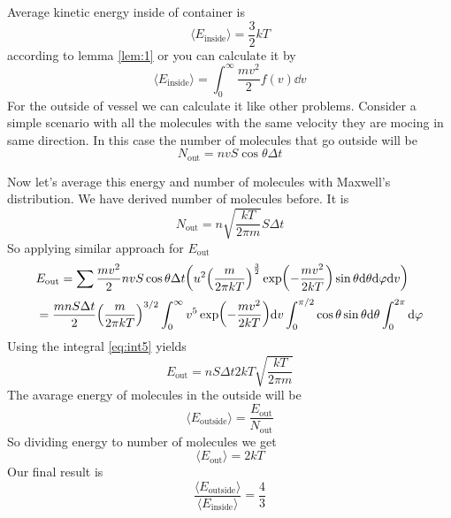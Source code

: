 \documentclass[a4paper, 12pt]{article}
\begin{document}
\begin{sol}
    Average kinetic energy inside of container is $$\langle E_{\text{inside}}\rangle=\frac{3}{2}kT$$ according to lemma \ref{lem:1} or you can calculate it by 
    $$\langle E_{\text{inside}}\rangle=\int_0^\infty\frac{mv^2}{2}f(v)\dd v$$
    For the outside of vessel we can calculate it like other problems. Consider a simple scenario with all the molecules with the same velocity they are mocing in same direction.
    In this case the number of molecules that go outside will be $$N_{\text{out}}=nvS\cos\theta\Delta t$$

    Now let's average this energy and number of molecules with Maxwell's distribution. We have derived number of molecules before. It is
    $$N_{\text{out}}=n\sqrt{\frac{kT}{2\pi m}}S\Delta t$$
    So applying similar approach for $E_{\text{out}}$
    \begin{align*}
        &E_{\text{out}}=\sum \frac{mv^2}{2}nvS\cos\theta\Delta t\qty(u^2\qty(\frac{m}{2\pi kT})^{\frac{3}{2}}\exp(-\frac{mv^2}{2kT})\sin\theta\dd\theta\dd\varphi\dd v)\\
        &=\frac{mnS\Delta t}{2}\qty(\frac{m}{2\pi kT})^{3/2}\int_0^\infty v^5\exp(-\frac{mv^2}{2kT})\dd v\int_0^{\pi/2}\cos\theta\sin\theta\dd\theta\int_0^{2\pi}\dd\varphi
    \end{align*}
    Using the integral \ref{eq:int5} yields
    $$E_{\text{out}}=nS\Delta t2kT\sqrt{\frac{kT}{2\pi m}}$$
    The avarage energy of molecules in the outside will be $$\langle E_{\text{outside}}\rangle=\frac{E_{\text{out}}}{N_{\text{out}}}$$
    So dividing energy to number of molecules we get $$\langle E_{\text{out}}\rangle=2kT$$
    Our final result is $$\frac{\langle E_{\text{outside}}\rangle}{\langle E_{\text{inside}}\rangle}=\frac{4}{3}$$
\end{sol}
\end{document}
